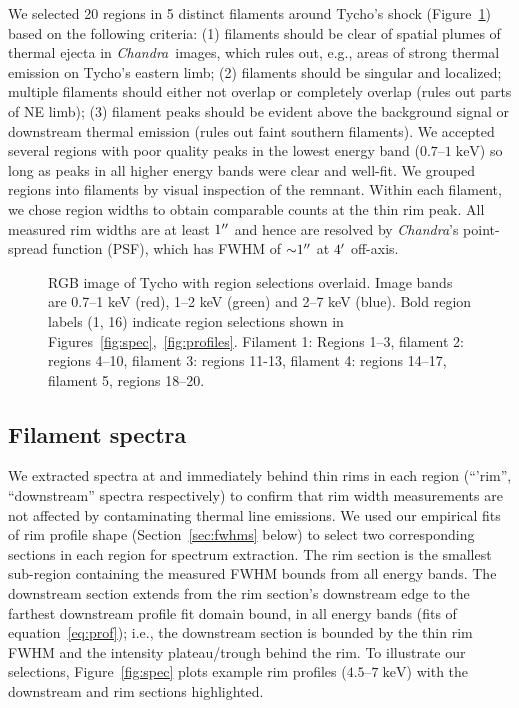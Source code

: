 \documentclass[iop, apj, numberedappendix]{emulateapj}
\newcommand*{\mt}{\mathrm}
\newcommand*{\unit}[1]{\;\mt{#1}}  %
\newcommand*{\abt}{\mathord{\sim}} %
\newcommand*{\Chandra}{\textit{Chandra}\ }
\begin{document}
We selected 20 regions in 5 distinct filaments around Tycho's shock
(Figure~\ref{fig:snr}) based on the following criteria: (1) filaments should be
clear of spatial plumes of thermal ejecta in \Chandra images, which rules out,
e.g., areas of strong thermal emission on Tycho's eastern limb; (2) filaments
should be singular and localized; multiple filaments should either not
overlap or completely overlap (rules out parts of NE limb); (3) filament
peaks should be evident above the background signal or downstream thermal
emission (rules out faint southern filaments).  We accepted several
regions with poor quality peaks in the lowest energy band ($0.7$--$1
\unit{keV}$) so long as peaks in all higher energy bands were clear and
well-fit.  We grouped regions into filaments by visual inspection of the
remnant.  Within each filament, we chose region widths to obtain comparable
counts at the thin rim peak.  All measured rim widths are at least $1\mbox{$^{\prime\prime}$}$
and hence are resolved by \textit{Chandra}'s point-spread function (PSF), which
has FWHM of $\abt 1\arcsec$ at $4\mbox{$^\prime$}$ off-axis.

\begin{figure}
    \centering
    \iftoggle{manuscript}{
        \texttt{[image: figures/f0-snr-inv.png]}
    }{
        \plotone{figures/f0-snr-inv.png}
    }
    \caption{RGB image of Tycho with region selections overlaid.  Image bands
    are 0.7--1 keV (red), 1--2 keV (green) and 2--7 keV (blue).  Bold region
    labels (1, 16) indicate region selections shown in
    Figures~\ref{fig:spec},~\ref{fig:profiles}.  Filament 1: Regions 1--3,
    filament 2: regions 4--10, filament 3: regions 11-13, filament 4:
    regions 14--17, filament 5, regions 18--20.
    \label{fig:snr}}
\end{figure}

\subsection{Filament spectra}
\label{sec:spec}

We extracted spectra at and immediately behind thin rims in each region
(``'rim'', ``downstream'' spectra respectively) to confirm that rim width
measurements are not affected by contaminating thermal line emissions.  We
used our empirical fits of rim profile shape (Section~\ref{sec:fwhms} below)
to select two corresponding sections in each region for spectrum extraction.
The rim section is the smallest sub-region containing the measured FWHM bounds
from all energy bands.  The downstream section extends from the rim section's
downstream edge to the farthest downstream profile fit domain bound, in all
energy bands (fits of equation~\eqref{eq:prof}); i.e., the downstream section
is bounded by the thin rim FWHM and the intensity plateau/trough behind the
rim.  To illustrate our selections, Figure~\ref{fig:spec} plots example rim
profiles ($4.5$--$7 \unit{keV}$) with the downstream and rim sections
highlighted.
\end{document}
